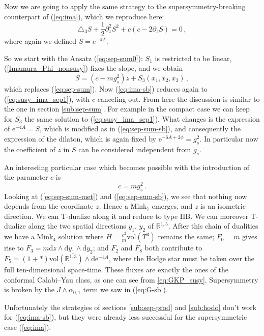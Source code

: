 \documentclass[12pt]{article}
\newcommand{\R}{\mathbb{R}}
\newcommand{\dd}{\mathrm{d}}
\newcommand{\e}{\mathrm{e}}
\newcommand{\vol}{\mathrm{vol}}
\begin{document}
Now we are going to apply the same strategy to the supersymmetry-breaking counterpart of (\ref{eq:ima}), which we reproduce here:
\begin{equation}\label{eq:ima-sb}
	\triangle_3 S + \frac12 \partial_z^2 S^2 + c(c - 2 \partial_z S)=0\,,
\end{equation}
where again we defined $S=\e^{-4A}$. 

So we start with the Ansatz (\ref{eq:sep-sum0}): $S_1$ is restricted to be linear, (\ref{Imamura_Phi_nonsusy}) fixes the slope, and we obtain
\begin{equation}\label{eq:sep-sum-sb}
 	S= (c- m g_s^2) z + S_3(x_1,x_2,x_3)\,,
\end{equation}                             
which replaces (\ref{eq:sep-sum}). Now (\ref{eq:ima-sb}) reduces again to (\ref{eq:susy_ima_sep1}), with $c$ canceling out. From here the discussion is similar to the one in section \ref{sub:sep-sum}. For example in the compact case we can keep for $S_3$ the same solution to (\ref{eq:susy_ima_sep1}). What changes is the expression of $\e^{-4A}=S$, which is modified as in (\ref{eq:sep-sum-sb}), and consequently the expression of the dilaton, which is again fixed by $\e^{-6A+ 2 \phi}= g_s^2$. In particular now the coefficient of $z$ in $S$ can be considered independent from $g_s$. 

An interesting particular case which becomes possible with the introduction of the parameter $c$ is 
\begin{equation}
	c= m g_s^2\,.
\end{equation}
Looking at (\ref{eq:sep-sum-met}) and (\ref{eq:sep-sum-sb}), we see that nothing now depends from the coordinate $z$. Hence a Mink$_7$ emerges, and $z$ is an isometric direction.
We can T-dualize along it and reduce to type IIB. We can moreover T-dualize along the two spatial directions $y_1$, $y_2$ of $\R^{1,5}$. After this chain of dualities we have a Mink$_4$ solution where $H=\frac{c^2}{m} \vol (T^3)$ remains the same; $F_0=m$ gives rise to $F_3 = m \dd z \wedge \dd y_1 \wedge \dd y_2$; and $F_2$ and $F_8$ both contribute to $F_5 = (1+*) \vol(\R^{1,3}) \wedge \dd \e^{-4A}$, where the Hodge star must be taken over the full ten-dimensional space-time. These  fluxes are exactly the ones of the conformal Calabi--Yau class, as one can see from \eqref{eq:GKP_susy}. Supersymmetry is broken by the $J \wedge \alpha_{0,1}$ term we saw in (\ref{eq:G-sb}).

Unfortunately the strategies of sections \ref{sub:sep-prod} and \ref{sub:hodo} don't work for (\ref{eq:ima-sb}), but they were already less successful for the supersymmetric case (\ref{eq:ima}).
\end{document}
